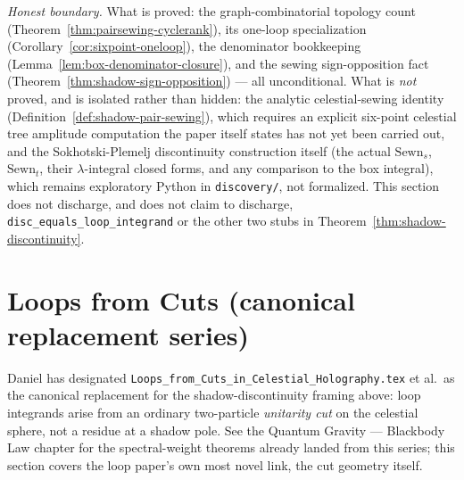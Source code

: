 \documentclass{report}
\theoremstyle{definition}
\begin{document}
\emph{Honest boundary.} What is proved: the graph-combinatorial topology count
(Theorem~\ref{thm:pairsewing-cyclerank}), its one-loop specialization
(Corollary~\ref{cor:sixpoint-oneloop}), the denominator bookkeeping
(Lemma~\ref{lem:box-denominator-closure}), and the sewing sign-opposition fact
(Theorem~\ref{thm:shadow-sign-opposition}) --- all unconditional. What is \emph{not}
proved, and is isolated rather than hidden: the analytic celestial-sewing identity
(Definition~\ref{def:shadow-pair-sewing}), which requires an explicit six-point celestial
tree amplitude computation the paper itself states has not yet been carried out, and the
Sokhotski-Plemelj discontinuity construction itself (the actual $\mathrm{Sewn}_s$,
$\mathrm{Sewn}_t$, their $\lambda$-integral closed forms, and any comparison to the box
integral), which remains exploratory Python in \texttt{discovery/}, not formalized. This
section does not discharge, and does not claim to discharge,
\texttt{disc\_equals\_loop\_integrand} or the other two stubs in
Theorem~\ref{thm:shadow-discontinuity}.

\section{Loops from Cuts (canonical replacement series)}

Daniel has designated \texttt{Loops\_from\_Cuts\_in\_Celestial\_Holography.tex} et al.\ as
the canonical replacement for the shadow-discontinuity framing above: loop integrands arise
from an ordinary two-particle \emph{unitarity cut} on the celestial sphere, not a residue at
a shadow pole. See the Quantum Gravity --- Blackbody Law chapter for the spectral-weight
theorems already landed from this series; this section covers the loop paper's own most
novel link, the cut geometry itself.
\end{document}
